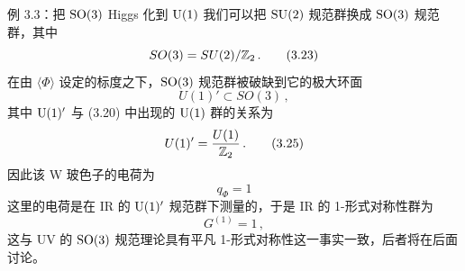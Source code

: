\begin{examplebox}{例 3.3：把 $\mathrm{SO}(3)$ Higgs 化到 $\mathrm{U}(1)$}
我们可以把 $\mathrm{SU}(2)$ 规范群换成 $\mathrm{SO}(3)$ 规范群，其中
\begin{equation}
  SO(3)=SU(2)/\mathbb{Z}_2\,. \tag{3.23}
\end{equation}
在由 $\langle\Phi\rangle$ 设定的标度之下，$\mathrm{SO}(3)$ 规范群被破缺到它的极大环面
\begin{equation}
  U(1)'\subset SO(3)\,, \tag{3.24}
\end{equation}
其中 $\mathrm{U}(1)'$ 与 (3.20) 中出现的 $\mathrm{U}(1)$ 群的关系为
\begin{equation}
  U(1)'=\frac{U(1)}{\mathbb{Z}_2}\,. \tag{3.25}
\end{equation}
因此该 W 玻色子的电荷为
\begin{equation}
  q_\Phi=1 \tag{3.26}
\end{equation}
这里的电荷是在 IR 的 $\mathrm{U}(1)'$ 规范群下测量的，于是 IR 的 1-形式对称性群为
\begin{equation}
  G^{(1)}=1\,, \tag{3.27}
\end{equation}
这与 UV 的 $\mathrm{SO}(3)$ 规范理论具有平凡 1-形式对称性这一事实一致，后者将在后面讨论。
\end{examplebox}


